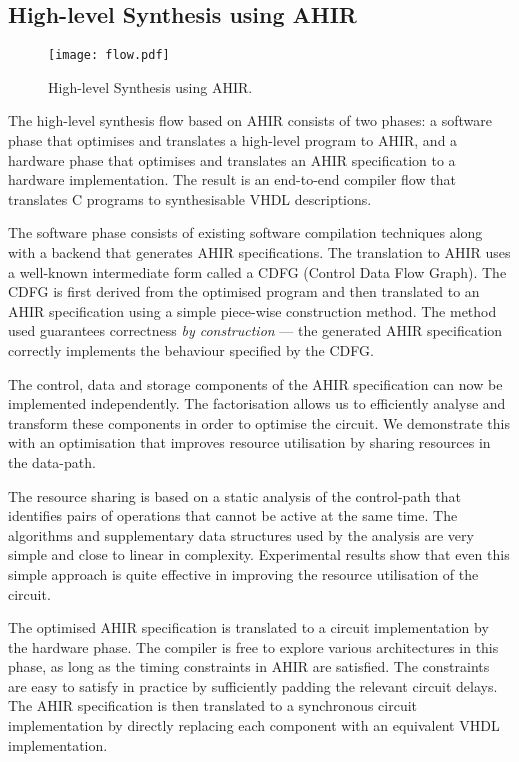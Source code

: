 \documentclass[12pt]{article}
\begin{document}
\subsection{High-level Synthesis using AHIR}

\begin{figure}[h]
  \centering
  \texttt{[image: flow.pdf]}
  \caption{High-level Synthesis using AHIR.}
\end{figure}

The high-level synthesis flow based on AHIR consists of two phases: a
software phase that optimises and translates a high-level program to
AHIR, and a hardware phase that optimises and translates an AHIR
specification to a hardware implementation. The result is an
end-to-end compiler flow that translates C programs to synthesisable
VHDL descriptions.

The software phase consists of existing software compilation
techniques along with a backend that generates AHIR specifications. 
The translation to AHIR uses a well-known intermediate form called a
CDFG (Control Data Flow Graph). The CDFG is first derived from the
optimised program and then translated to an AHIR specification using a
simple piece-wise construction method. The method used guarantees
correctness {\it by construction} --- the generated AHIR specification
correctly implements the behaviour specified by the CDFG.

The control, data and storage components of the AHIR specification  can
now be implemented independently. The factorisation allows us to
efficiently analyse and transform these components in order to
optimise the circuit. We demonstrate this with an optimisation
that improves resource utilisation by sharing resources in the
data-path.

The resource sharing is based on a static analysis of the control-path
that identifies pairs of operations that cannot be active at the same
time. The algorithms and supplementary data structures used by the
analysis are very simple and close to linear in complexity. 
Experimental results show that even this simple approach is quite
effective in improving the resource utilisation of the circuit.

The optimised AHIR specification is translated to a circuit
implementation by the hardware phase. The compiler is free to explore
various architectures in this phase, as long as the timing constraints
in AHIR are satisfied. The constraints are easy to satisfy in practice
by sufficiently padding the relevant circuit delays. The AHIR
specification is then translated to a synchronous circuit
implementation by directly replacing each component with an equivalent
VHDL implementation.
\end{document}
